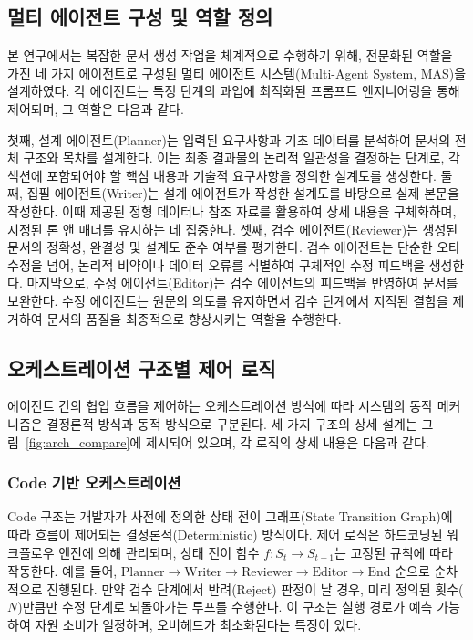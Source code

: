 \subsection{멀티 에이전트 구성 및 역할 정의}
본 연구에서는 복잡한 문서 생성 작업을 체계적으로 수행하기 위해, 전문화된 역할을 가진 네 가지 에이전트로 구성된 멀티 에이전트 시스템(Multi-Agent System, MAS)을 설계하였다. 각 에이전트는 특정 단계의 과업에 최적화된 프롬프트 엔지니어링을 통해 제어되며, 그 역할은 다음과 같다.

첫째, 설계 에이전트(Planner)는 입력된 요구사항과 기초 데이터를 분석하여 문서의 전체 구조와 목차를 설계한다. 이는 최종 결과물의 논리적 일관성을 결정하는 단계로, 각 섹션에 포함되어야 할 핵심 내용과 기술적 요구사항을 정의한 설계도를 생성한다. 둘째, 집필 에이전트(Writer)는 설계 에이전트가 작성한 설계도를 바탕으로 실제 본문을 작성한다. 이때 제공된 정형 데이터나 참조 자료를 활용하여 상세 내용을 구체화하며, 지정된 톤 앤 매너를 유지하는 데 집중한다. 셋째, 검수 에이전트(Reviewer)는 생성된 문서의 정확성, 완결성 및 설계도 준수 여부를 평가한다. 검수 에이전트는 단순한 오타 수정을 넘어, 논리적 비약이나 데이터 오류를 식별하여 구체적인 수정 피드백을 생성한다. 마지막으로, 수정 에이전트(Editor)는 검수 에이전트의 피드백을 반영하여 문서를 보완한다. 수정 에이전트는 원문의 의도를 유지하면서 검수 단계에서 지적된 결함을 제거하여 문서의 품질을 최종적으로 향상시키는 역할을 수행한다.

\subsection{오케스트레이션 구조별 제어 로직}
에이전트 간의 협업 흐름을 제어하는 오케스트레이션 방식에 따라 시스템의 동작 메커니즘은 결정론적 방식과 동적 방식으로 구분된다. 세 가지 구조의 상세 설계는 그림~\ref{fig:arch_compare}에 제시되어 있으며, 각 로직의 상세 내용은 다음과 같다.

\subsubsection{Code 기반 오케스트레이션}
Code 구조는 개발자가 사전에 정의한 상태 전이 그래프(State Transition Graph)에 따라 흐름이 제어되는 결정론적(Deterministic) 방식이다. 제어 로직은 하드코딩된 워크플로우 엔진에 의해 관리되며, 상태 전이 함수 $f: S_t \rightarrow S_{t+1}$는 고정된 규칙에 따라 작동한다. 예를 들어, $\text{Planner} \rightarrow \text{Writer} \rightarrow \text{Reviewer} \rightarrow \text{Editor} \rightarrow \text{End}$ 순으로 순차적으로 진행된다. 만약 검수 단계에서 반려(Reject) 판정이 날 경우, 미리 정의된 횟수($N$)만큼만 수정 단계로 되돌아가는 루프를 수행한다. 이 구조는 실행 경로가 예측 가능하여 자원 소비가 일정하며, 오버헤드가 최소화된다는 특징이 있다.


